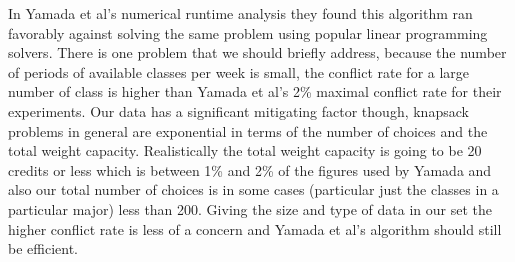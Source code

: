 \documentclass[11pt]{article} %
\begin{document}
In Yamada et al’s \cite{yamada:heuristic} numerical runtime analysis they found
this algorithm ran favorably against solving the same problem using popular
linear programming solvers.  There is one problem that we should briefly address,
because the number of periods of available classes per week is small,
the conflict rate for a large number of class is higher than Yamada
et al’s 2\% maximal conflict rate for their experiments.  Our data has
a significant mitigating factor though, knapsack problems in general are
exponential in terms of the number of choices and the total weight capacity.
Realistically the total weight capacity is going to be 20 credits or less which
is between 1\% and 2\% of the figures used by Yamada \cite{yamada:heuristic} and
also our total number of choices is in some cases (particular just the classes
in a particular major) less than 200.  Giving the size and type of data in our
set the higher conflict rate is less of a concern and Yamada et al’s algorithm
should still be efficient.

{}  
\end{document}
